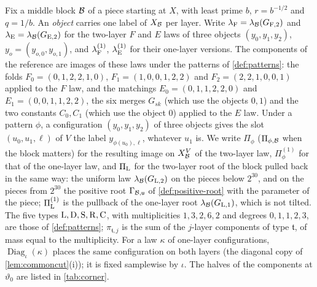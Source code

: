 Fix a middle block $\mathcal B$ of a piece starting at $X$, with least prime $b$,
$r=b^{-1/2}$ and $q=1/b$. An \emph{object} carries one label of $X_{\mathcal B}$
per layer. Write $\lambda_{\rm F}=\lambda_{\mathcal B}(G_{\rm F,2})$ and
$\lambda_{\rm E}=\lambda_{\mathcal B}(G_{\rm E,2})$ for the two-layer $F$ and $E$
laws of three objects $(y_0,y_1,y_2)$, $y_o=(y_{o,0},y_{o,1})$, and
$\lambda^{(1)}_{\rm F}$, $\lambda^{(1)}_{\rm E}$ for their one-layer versions.
The components of the reference are images of these laws under the patterns
of \cref{def:patterns}: the folds $F_0=(0,1,2,2,1,0)$, $F_1=(1,0,0,1,2,2)$ and
$F_2=(2,2,1,0,0,1)$ applied to the $F$ law, and the matchings
$E_0=(0,1,1,2,2,0)$ and $E_1=(0,0,1,1,2,2)$, the six merges $G_{sk}$ (which use
the objects $0,1$) and the two constants $C_0,C_1$ (which use the object $0$)
applied to the $E$ law. Under a pattern $\phi$, a configuration
$(y_0,y_1,y_2)$ of three objects gives the slot $(u_0,u_1,\ell)$ of $V$ the
label $y_{\phi(u_0),\ell}$, whatever $u_1$ is. We write $\Pi_\phi$
($\Pi_{\phi,\mathcal B}$ when the block matters) for the resulting image on
$X_{\mathcal B}^V$ of the two-layer law, $\Pi^{(1)}_\phi$ for that of the one-layer
law, and $\Pi_{\rm L}$ for the two-layer root of the block pulled back in the
same way: the uniform law $\lambda_{\mathcal B}(G_{\rm L,2})$ on the pieces below $2^{30}$, and on the pieces from $2^{30}$ the positive root
$\Gamma_{\mathcal B,\mathsf u}$ of \cref{def:positive-root} with the parameter of the
piece; $\Pi^{(1)}_{\rm L}$ is the pullback of the one-layer root
$\lambda_{\mathcal B}(G_{\rm L,1})$, which is not tilted. The five types
$\rm L,D,S,R,C$, with multiplicities $1,3,2,6,2$ and degrees $0,1,1,2,3$, are
those of \cref{def:patterns}; $\pi_{\mathfrak t,j}$ is the sum of the $j$-layer
components of type $\mathfrak t$, of mass equal to the multiplicity. For a law
$\kappa$ of one-layer configurations, $\operatorname{Diag}_\iota(\kappa)$
places the same configuration on both layers (the diagonal copy of
\cref{lem:commoncut}(i)); it is fixed samplewise by $\iota$. The halves of the
components at $\vartheta_0$ are listed in \cref{tab:corner}.

